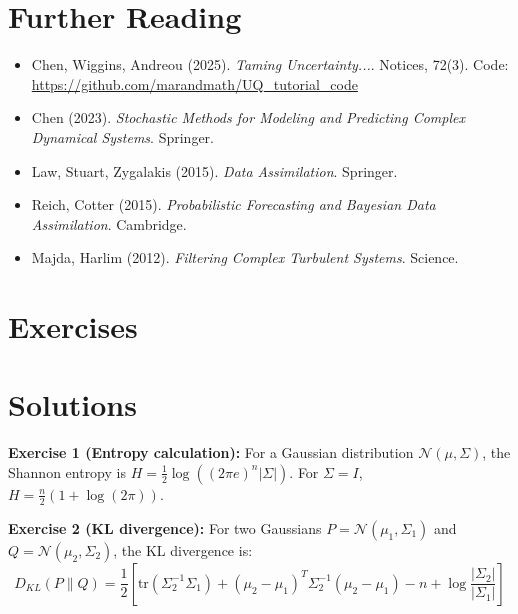 \section{Further Reading}
\label{sec:uq:refs}

\begin{itemize}
    \item Chen, Wiggins, Andreou (2025). \textit{Taming Uncertainty...}. Notices, 72(3). Code: \url{https://github.com/marandmath/UQ_tutorial_code}
    \item Chen (2023). \textit{Stochastic Methods for Modeling and Predicting Complex Dynamical Systems}. Springer.
    \item Law, Stuart, Zygalakis (2015). \textit{Data Assimilation}. Springer.
    \item Reich, Cotter (2015). \textit{Probabilistic Forecasting and Bayesian Data Assimilation}. Cambridge.
    \item Majda, Harlim (2012). \textit{Filtering Complex Turbulent Systems}. Science.
\end{itemize}

\section{Exercises}
\section{Solutions}
\label{sec:uq:solutions}

\begin{solution}
\textbf{Exercise 1 (Entropy calculation):} For a Gaussian distribution $\mathcal{N}(\mu, \Sigma)$, the Shannon entropy is $H = \frac{1}{2}\log((2\pi e)^n |\Sigma|)$. For $\Sigma = I$, $H = \frac{n}{2}(1 + \log(2\pi))$.
\end{solution}

\begin{solution}
\textbf{Exercise 2 (KL divergence):} For two Gaussians $P = \mathcal{N}(\mu_1, \Sigma_1)$ and $Q = \mathcal{N}(\mu_2, \Sigma_2)$, the KL divergence is:
$$D_{KL}(P\|Q) = \frac{1}{2}\left[\text{tr}(\Sigma_2^{-1}\Sigma_1) + (\mu_2 - \mu_1)^T \Sigma_2^{-1}(\mu_2 - \mu_1) - n + \log\frac{|\Sigma_2|}{|\Sigma_1|}\right]$$
\end{solution}

